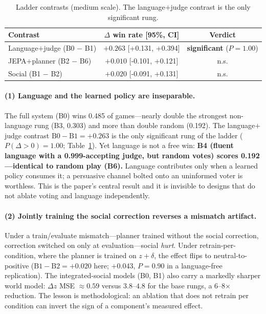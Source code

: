 \documentclass[11pt]{article}
\newcommand{\ci}[2]{{\footnotesize [#1, #2]}}
\newcommand{\num}[1]{#1}
\begin{document}
\begin{table}[t]
\centering
\small
\begin{tabular}{lcc}
\toprule
Contrast & $\Delta$ win rate \ci{95\%}{CI} & Verdict \\
\midrule
Language$+$judge \; (B0 $-$ B1) & $+0.263$ \ci{+0.131}{+0.394} & \textbf{significant} ($P{=}1.00$) \\
JEPA$+$planner \; (B2 $-$ B6)   & $+0.010$ \ci{-0.101}{+0.121} & n.s. \\
Social \; (B1 $-$ B2)           & $+0.020$ \ci{-0.091}{+0.131} & n.s. \\
\bottomrule
\end{tabular}
\caption{Ladder contrasts (medium scale). The language$+$judge contrast is the
only significant rung.}
\label{tab:contrasts}
\end{table}

\paragraph{(1) Language and the learned policy are inseparable.} The full system
(B0) wins \num{0.485} of games---nearly double the strongest non-language rung
(B3, \num{0.303}) and more than double random (\num{0.192}). The language$+$judge
contrast $\mathrm{B0}-\mathrm{B1} = +0.263$ is the only significant rung of the
ladder ($P(\Delta>0)=1.00$; Table~\ref{tab:contrasts}). Yet language is not a free
win: \textbf{B4 (fluent language with a \num{0.999}-accepting judge, but random
votes) scores \num{0.192}---identical to random play (B6).} Language contributes
only when a learned policy consumes it; a persuasive channel bolted onto an
uninformed voter is worthless. This is the paper's central result and it is
invisible to designs that do not ablate voting and language independently.

\paragraph{(2) Jointly training the social correction reverses a mismatch
artifact.} Under a train/evaluate mismatch---planner trained without the social
correction, correction switched on only at evaluation---social \emph{hurt}. Under
retrain-per-condition, where the planner is trained on $z+\delta$, the effect
flips to neutral-to-positive ($\mathrm{B1}-\mathrm{B2}=+0.020$ here; $+0.043$,
$P{=}0.90$ in a language-free replication). The integrated-social models (B0, B1)
also carry a markedly sharper world model: $\Delta z$ MSE $\approx 0.59$ versus
$3.8$--$4.8$ for the base rungs, a 6--8$\times$ reduction. The lesson is
methodological: an ablation that does not retrain per condition can invert the
sign of a component's measured effect.
\end{document}
